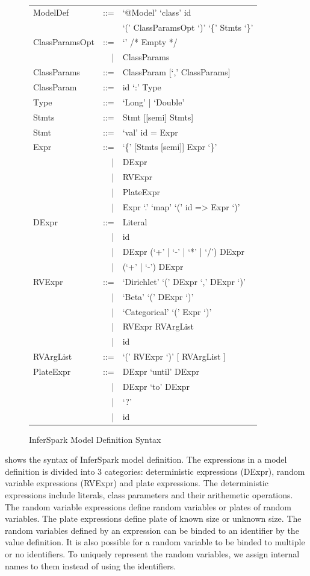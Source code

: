 \begin{figure}[!h]
\scriptsize
	\begin{tabular}{lrl}
		ModelDef		& ::= & `@Model' `class' id \\
					&     &`(' ClassParamsOpt `)' `\{' Stmts `\}' \\
		ClassParamsOpt	& ::= & `' /* Empty */ \\
						&	| &	ClassParams \\
		ClassParams		& ::= & ClassParam  [`,' ClassParams] \\
		ClassParam		& ::= & id `:' Type \\
		Type			& ::= & `Long' | `Double' \\
		Stmts			& ::= & Stmt [[semi] Stmts]\\
		Stmt			& ::= & `val' id = Expr \\
		Expr			& ::= & `\{' [Stmts [semi]] Expr `\}' \\
						&	| & DExpr	\\
						&   | & RVExpr \\
						&	| & PlateExpr \\
						&	| & Expr `.' `map' `(' id => Expr `)'\\
		DExpr			& ::= & Literal	\\
						&   | & id \\
						&   | & DExpr (`+' | `-' | `*' | `/') DExpr \\
						&   | & (`+' | `-') DExpr	\\
		RVExpr			& ::= & `Dirichlet' `(' DExpr `,' DExpr `)' \\
						&   | & `Beta' `(' DExpr `)' \\
						&   | & `Categorical' `(' Expr `)' \\
						&   | & RVExpr RVArgList	\\
						&   | & id	\\
		RVArgList		& ::= & `(' RVExpr `)' [ RVArgList ] \\
		PlateExpr		& ::= & DExpr `until' DExpr	\\ 
						&   | & DExpr `to' DExpr	\\
						&	| & `?' \\
						&	| & id
	\end{tabular}
\caption{InferSpark Model Definition Syntax}
\label{fig:inferspark_syntax}
\end{figure}

 shows the syntax of InferSpark model
definition. The expressions in a model definition is divided into 3
categories: deterministic expressions (DExpr), random variable expressions
(RVExpr) and plate expressions. The deterministic expressions include
literals, class parameters and their arithemetic operations. The random
variable expressions define random variables or plates of random variables.
The plate expressions define plate of known size or unknown size. The random
variables defined by an expression can be binded to an identifier by the value
definition. It is also possible for a random variable to be binded to multiple
or no identifiers. To uniquely represent the random variables, we assign
internal names to them instead of using the identifiers.

